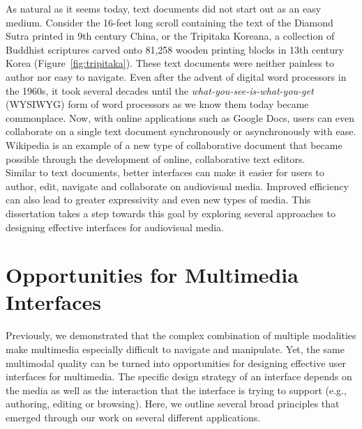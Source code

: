 As natural as it seems today, text documents did not start out as an easy medium.
% 
%
Consider the 16-feet long scroll containing the text of the Diamond Sutra printed in 9th century China, or the Tripitaka Koreana, a collection of Buddhist scriptures carved onto 81,258 wooden printing blocks in 13th century Korea (Figure~\ref{fig:tripitaka}). These text documents were neither painless to author nor easy to navigate. Even after the advent of digital word processors in the 1960s, it took several decades until the \emph{what-you-see-is-what-you-get} (WYSIWYG) form of word processors as we know them today became commonplace. Now, with online applications such as Google Docs, users can even collaborate on a single text document synchronously or asynchronously with ease. Wikipedia is an example of a new type of collaborative document that became possible through the development of online, collaborative text editors. \\

Similar to text documents, better interfaces can make it easier for users to author, edit, navigate and collaborate on audiovisual media. Improved efficiency can also lead to greater expressivity and even new types of media. This dissertation takes a step towards this goal by exploring several approaches to designing effective interfaces for audiovisual media.

\section{Opportunities for Multimedia Interfaces}
Previously, we demonstrated that the complex combination of multiple modalities make multimedia especially difficult to navigate and manipulate. Yet, the same multimodal quality can be turned into opportunities for designing effective user interfaces for multimedia. The specific design strategy of an interface depends on the media as well as the interaction that the interface is trying to support (e.g., authoring, editing or browsing). Here, we outline several broad principles that emerged through our work on several different applications.\\
%

